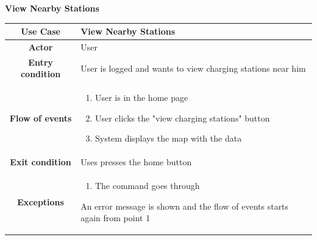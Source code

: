 \documentclass[table, 12pt]{article} %
\begin{document}
\begin{itemize}
            \begin{table}[H]
                \item[] \textbf{View Nearby Stations}
                \item[]
                \centering
                \begin{tabular}{|c |m{}|}
                    \hline
                    \textbf{Use Case} & View Nearby Stations\\ \hline
                    \textbf{Actor} & User\\ \hline
                    \textbf{Entry condition} & User is logged and wants to view charging stations near him\\  \hline
                    \textbf{Flow of events} & \begin{enumerate}
                                                \item User is in the home page
                                                \item User clicks the "view charging stations" button
                                                \item System displays the map with the data
                                            \end{enumerate}\\ \hline
                    \textbf{Exit condition} & Uses presses the home button  \\ \hline
                    \textbf{Exceptions} &  \begin{enumerate}
                        \item The command goes through
                    \end{enumerate}
                    An error message is shown and the flow of events starts again from point 1\\ \hline
                \end{tabular}
            \end{table}



\end{itemize}
\end{document}
